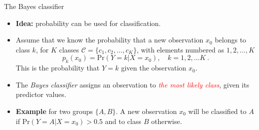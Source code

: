 \documentclass[
  10pt,
  ignorenonframetext,
]{beamer}
\providecommand{\tightlist}{%
  \setlength{\itemsep}{0pt}\setlength{\parskip}{0pt}}
\begin{document}
\begin{frame}{The Bayes classifier}
\protect\hypertarget{the-bayes-classifier}{}
\begin{itemize}
\tightlist
\item
  \textbf{Idea:} probability can be used for classification.
\end{itemize}

\vspace{0mm}

\begin{itemize}
\item
  Assume that we know the probability that a new observation \(x_0\)
  belongs to class \(k\), for \(K\) classes
  \(\mathcal{C} = \{c_1, c_2,\ldots, c_K\}\), with elements numbered as
  \(1, 2, ..., K\)
  \[p_k(x_0) = \text{Pr}(Y=k | X=x_0), \quad k = 1, 2, ... K \ .\] This
  is the probability that \(Y=k\) given the observation \(x_0\).
  \vspace{1mm}
\item
  The \emph{Bayes classifier} assigns an observation to
  \emph{\textcolor{red}{the most likely class}}, given its predictor
  values.
\item
  \textbf{Example} for two groups \(\{A, B\}\). A new observation
  \(x_0\) will be classified to \(A\) if
  \(\text{Pr}(Y=A | X=x_0) > 0.5\) and to class \(B\) otherwise.
\end{itemize}
\end{frame}
\end{document}
